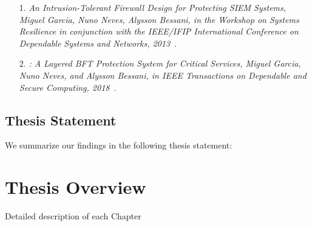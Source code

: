 \begin{enumerate}
\item[1.] \emph{An Intrusion-Tolerant Firewall Design for Protecting SIEM Systems, Miguel Garcia, Nuno Neves, Alysson Bessani, in the Workshop on Systems Resilience in conjunction with the IEEE/IFIP International Conference on Dependable Systems and Networks, 2013}~\cite{Garcia:2013}.

\item[2.] \emph{\sieveq: A Layered BFT Protection System for Critical Services, Miguel Garcia, Nuno Neves, and Alysson Bessani, in IEEE Transactions on Dependable and Secure Computing, 2018}~\cite{Garcia:2016}.
\end{enumerate}


\subsection*{Thesis Statement}
We summarize our findings in the following thesis statement:


\vspace{2mm}

\section{Thesis Overview}
Detailed description of each Chapter
